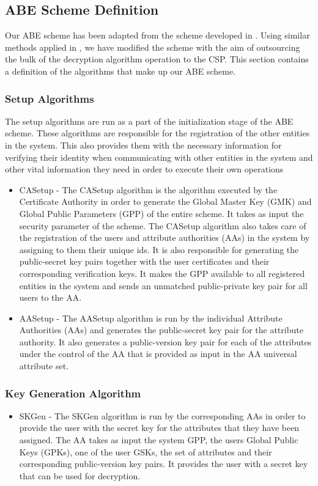 \subsection{ABE Scheme Definition}

Our ABE scheme has been adapted from the scheme developed in \cite{Yang2014}. Using similar methods applied in \cite{Green2011outsource}, we have modified the scheme with the aim of outsourcing the bulk of the decryption algorithm operation to the CSP. This section contains a definition of the algorithms that make up our ABE scheme.

\subsubsection*{Setup Algorithms}
The setup algorithms are run as a part of the initialization stage of the ABE scheme. These algorithms are responsible for the registration of the other entities in the system. This also provides them with the necessary information for verifying their identity when communicating with other entities in the system and other vital information they need in order to execute their own operations
\begin{itemize}
	\item CASetup - The CASetup algorithm is the algorithm executed by the Certificate Authority in order to generate the Global Master Key (GMK) and Global Public Parameters (GPP) of the entire scheme. It takes as input the security parameter of the scheme. The CASetup algorithm also takes care of the registration of the users and attribute authorities (AAs) in the system by assigning to them their unique ids. It is also responsible for generating the public-secret key pairs together with the user certificates and their corresponding verification keys. It makes the GPP available to all registered entities in the system and sends an unmatched public-private key pair for all users to the AA.
	
	\item AASetup - The AASetup algorithm is run by the individual Attribute Authorities (AAs) and generates the public-secret key pair for the attribute authority. It also generates a public-version key pair for each of the attributes under the control of the AA that is provided as input in the AA universal attribute set.
\end{itemize}

\subsubsection*{Key Generation Algorithm}
\begin{itemize}
	\item SKGen - The SKGen algorithm is run by the corresponding AAs in order to provide the user with the secret key for the attributes that they have been assigned. The AA takes as input the system GPP, the users Global Public Keys (GPKs), one of the user GSKs, the set of attributes and their corresponding public-version key pairs. It provides the user with a secret key that can be used for decryption.
\end{itemize}

